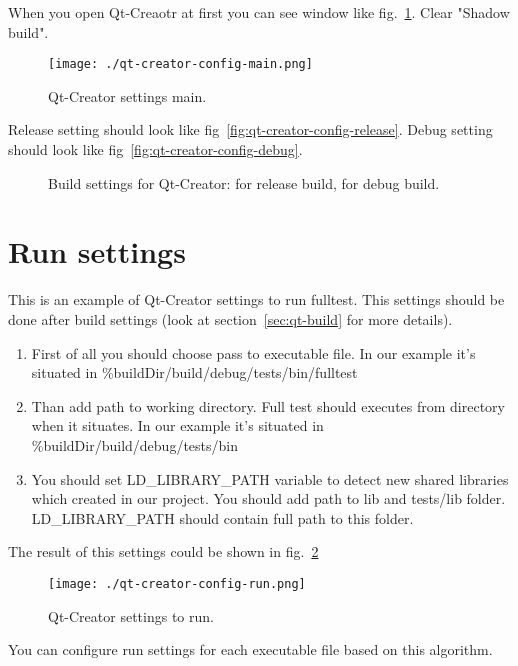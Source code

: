When you open Qt-Creaotr at first you can see window like fig.~\ref{fig:qt-creator-config-main}. Clear "Shadow build".

\begin{figure}[ht]
  \centering
  \texttt{[image: ./qt-creator-config-main.png]}
  \caption{Qt-Creator settings main.}
  \label{fig:qt-creator-config-main}
\end{figure}

Release setting should look like fig~\ref{fig:qt-creator-config-release}. Debug setting should look like fig~\ref{fig:qt-creator-config-debug}.

\begin{figure}[ht]
  \centering
  \caption{Build settings for Qt-Creator:  for release build,  for debug build.}
\end{figure}

\section{Run settings}

This is an example of Qt-Creator settings to run fulltest. This settings should be done after build settings (look at section~\ref{sec:qt-build} for more details).

\begin{enumerate}
  \item First of all you should choose pass to executable file. In our example it's situated in \%{buildDir}/build/debug/tests/bin/fulltest
  \item Than add path to working directory. Full test should executes from directory when it situates. In our example it's situated in \%{buildDir}/build/debug/tests/bin
  \item You should set LD\_LIBRARY\_PATH variable to detect new shared libraries which created in our project. You should add path to lib and tests/lib folder. LD\_LIBRARY\_PATH should contain full path to this folder.
\end{enumerate}

The result of this settings could be shown in fig.~\ref{fig:qt-creator-config-run}

\begin{figure}[ht]
  \centering
  \texttt{[image: ./qt-creator-config-run.png]}
  \caption{Qt-Creator settings to run.}
  \label{fig:qt-creator-config-run}
\end{figure}

You can configure run settings for each executable file based on this algorithm.

\printindex



